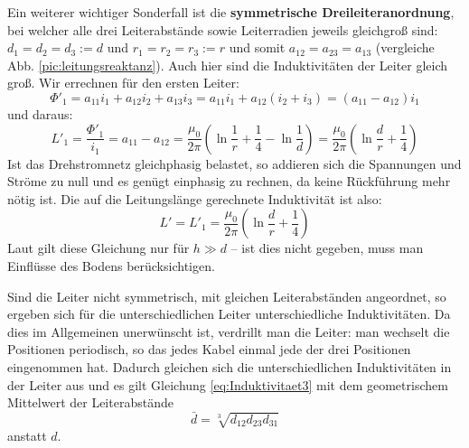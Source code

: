 Ein weiterer wichtiger Sonderfall ist die \textbf{symmetrische Dreileiteranordnung}, bei welcher alle drei Leiterabstände sowie Leiterradien jeweils gleichgroß sind: $d_1=d_2=d_3:=d$ und $r_1=r_2=r_3:=r$ und somit $a_{12}=a_{23}=a_{13}$ (vergleiche Abb. \ref{pic:leitungsreaktanz}). Auch hier sind die Induktivitäten der Leiter gleich groß. Wir errechnen für den ersten Leiter:
\begin{equation}
\Phi'_1 = a_{11}i_1+a_{12}i_2+a_{13}i_3 = a_{11}i_1+a_{12}\left(i_2+i_3\right) = \left(a_{11}-a_{12}\right)i_1
\end{equation}
und daraus:
\begin{equation}
L'_1 = \frac{\Phi'_1}{i_1} = a_{11}-a_{12} = \frac{\mu_0}{2\pi}\left(\ln\frac{1}{r}+\frac{1}{4}-\ln\frac{1}{d} \right) =
\frac{\mu_0}{2\pi}\left(\ln\frac{d}{r}+\frac{1}{4} \right)
\end{equation}
Ist das Drehstromnetz gleichphasig belastet, so addieren sich die Spannungen und Ströme zu null und es genügt einphasig zu rechnen, da keine Rückführung mehr nötig ist. Die auf die Leitungslänge gerechnete Induktivität ist also:
\begin{equation}\label{eq:Induktivitaet3}
L' = L'_1 = \frac{\mu_0}{2\pi}\left(\ln\frac{d}{r}+\frac{1}{4} \right)
\end{equation}
Laut \cite{Harrison} gilt diese Gleichung nur für $h\gg d$ – ist dies nicht gegeben, muss man Einflüsse des Bodens berücksichtigen.

Sind die Leiter nicht symmetrisch, mit gleichen Leiterabständen angeordnet, so ergeben sich für die unterschiedlichen Leiter unterschiedliche Induktivitäten. Da dies im Allgemeinen unerwünscht ist, verdrillt man die Leiter: man wechselt die Positionen periodisch, so das jedes Kabel einmal jede der drei Positionen eingenommen hat. Dadurch gleichen sich die unterschiedlichen Induktivitäten in der Leiter aus und es gilt Gleichung \eqref{eq:Induktivitaet3} mit dem geometrischem Mittelwert der Leiterabstände
\begin{equation}
\bar{d} = \sqrt[3]{d_{12}d_{23}d_{31}}
\end{equation}
anstatt $d$.


